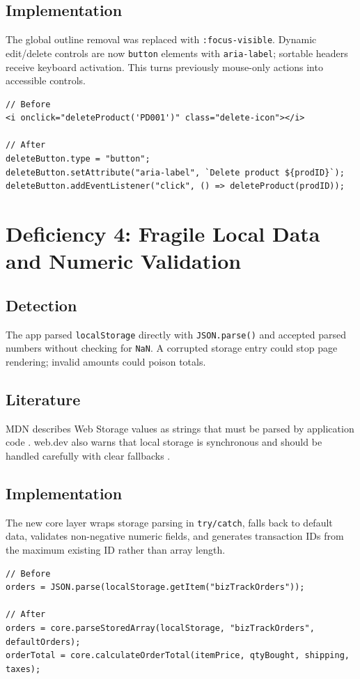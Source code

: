 \documentclass[12pt]{article}
\begin{document}
\subsection{Implementation}
The global outline removal was replaced with \texttt{:focus-visible}. Dynamic edit/delete controls are now \texttt{button} elements with \texttt{aria-label}; sortable headers receive keyboard activation. This turns previously mouse-only actions into accessible controls.
\begin{lstlisting}[caption={Before and after: actionable controls}]
// Before
<i onclick="deleteProduct('PD001')" class="delete-icon"></i>

// After
deleteButton.type = "button";
deleteButton.setAttribute("aria-label", `Delete product ${prodID}`);
deleteButton.addEventListener("click", () => deleteProduct(prodID));
\end{lstlisting}

\section{Deficiency 4: Fragile Local Data and Numeric Validation}
\subsection{Detection}
The app parsed \texttt{localStorage} directly with \texttt{JSON.parse()} and accepted parsed numbers without checking for \texttt{NaN}. A corrupted storage entry could stop page rendering; invalid amounts could poison totals.
\subsection{Literature}
MDN describes Web Storage values as strings that must be parsed by application code \cite{mdn-storage}. web.dev also warns that local storage is synchronous and should be handled carefully with clear fallbacks \cite{web-storage}.
\subsection{Implementation}
The new core layer wraps storage parsing in \texttt{try/catch}, falls back to default data, validates non-negative numeric fields, and generates transaction IDs from the maximum existing ID rather than array length.
\begin{lstlisting}[caption={Before and after: resilient storage}]
// Before
orders = JSON.parse(localStorage.getItem("bizTrackOrders"));

// After
orders = core.parseStoredArray(localStorage, "bizTrackOrders", defaultOrders);
orderTotal = core.calculateOrderTotal(itemPrice, qtyBought, shipping, taxes);
\end{lstlisting}
\end{document}
